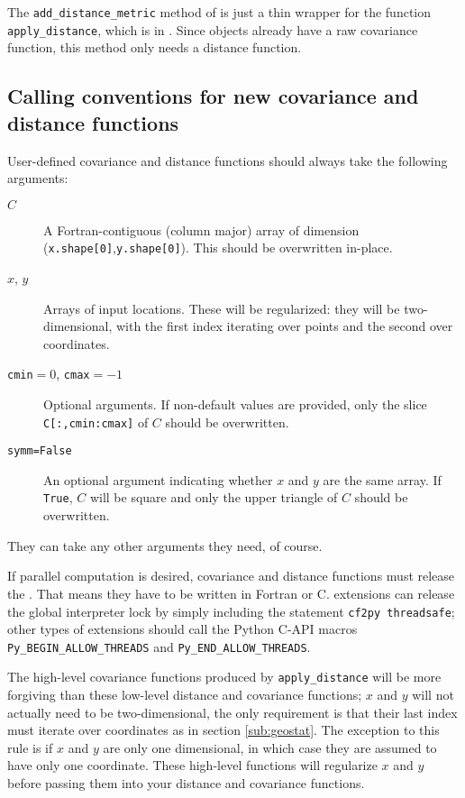\documentclass[]{manual}
\begin{document}
The \texttt{add_distance_metric} method of  is just a thin wrapper for the function \texttt{apply_distance}, which is in . Since  objects already have a raw covariance function, this method only needs a distance function.



\subsection{Calling conventions for new covariance and distance functions}
\label{sub:user_ccs}

User-defined covariance and distance functions should always take the following arguments:
\begin{description}
	\item[$C$] A Fortran-contiguous (column major) array of dimension (\texttt{x.shape[0]},\texttt{y.shape[0]}). This should be overwritten in-place.
	\item[$x$, $y$] Arrays of input locations. These will be regularized: they will be two-dimensional, with the first index iterating over points and the second over coordinates.
	\item[\texttt{cmin}$=0$, \texttt{cmax}$=-1$] Optional arguments. If non-default values are provided, only the slice \texttt{C[:,cmin:cmax]} of $C$ should be overwritten.
	\item[\texttt{symm=False}] An optional argument indicating whether $x$ and $y$ are the same array. If \texttt{True}, $C$ will be square and only the upper triangle of $C$ should be overwritten.
\end{description}
They can take any other arguments they need, of course.

If parallel computation is desired, covariance and distance functions must release the . That means they have to be written in Fortran or C.  extensions can release the global interpreter lock by simply including the statement \texttt{cf2py threadsafe}; other types of extensions should call the Python C-API macros \texttt{Py_BEGIN_ALLOW_THREADS} and \texttt{Py_END_ALLOW_THREADS}.

The high-level covariance functions produced by \texttt{apply_distance} will be more forgiving than these low-level distance and covariance functions; $x$ and $y$ will not actually need to be two-dimensional, the only requirement is that their last index must iterate over coordinates as in section \ref{sub:geostat}. The exception to this rule is if $x$ and $y$ are only one dimensional, in which case they are assumed to have only one coordinate. These high-level functions will regularize $x$ and $y$ before passing them into your distance and covariance functions.
\end{document}
